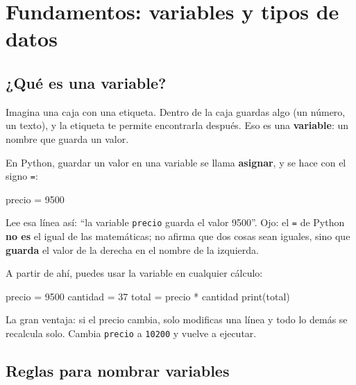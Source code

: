 \documentclass[
  spanish,
  letterpaper,
  DIV=11,
  numbers=noendperiod]{scrreprt}
\newenvironment{Shaded}{\begin{snugshade}}{\end{snugshade}}
\newcommand{\BuiltInTok}[1]{\textcolor[rgb]{0.00,0.23,0.31}{#1}}
\newcommand{\DecValTok}[1]{\textcolor[rgb]{0.68,0.00,0.00}{#1}}
\newcommand{\NormalTok}[1]{\textcolor[rgb]{0.00,0.23,0.31}{#1}}
\newcommand{\OperatorTok}[1]{\textcolor[rgb]{0.37,0.37,0.37}{#1}}
\begin{document}

\chapter{Fundamentos: variables y tipos de
datos}\label{fundamentos-variables-y-tipos-de-datos}

\section{¿Qué es una variable?}\label{quuxe9-es-una-variable}

Imagina una caja con una etiqueta. Dentro de la caja guardas algo (un
número, un texto), y la etiqueta te permite encontrarla después. Eso es
una \textbf{variable}: un nombre que guarda un valor.

En Python, guardar un valor en una variable se llama \textbf{asignar}, y
se hace con el signo \texttt{=}:

\begin{Shaded}
\begin{Highlighting}[]
\NormalTok{precio }\OperatorTok{=} \DecValTok{9500}
\end{Highlighting}
\end{Shaded}

Lee esa línea así: ``la variable \texttt{precio} guarda el valor 9500''.
Ojo: el \texttt{=} de Python \textbf{no es} el igual de las matemáticas;
no afirma que dos cosas sean iguales, sino que \textbf{guarda} el valor
de la derecha en el nombre de la izquierda.

A partir de ahí, puedes usar la variable en cualquier cálculo:

\begin{Shaded}
\begin{Highlighting}[]
\NormalTok{precio }\OperatorTok{=} \DecValTok{9500}
\NormalTok{cantidad }\OperatorTok{=} \DecValTok{37}
\NormalTok{total }\OperatorTok{=}\NormalTok{ precio }\OperatorTok{*}\NormalTok{ cantidad}
\BuiltInTok{print}\NormalTok{(total)}
\end{Highlighting}
\end{Shaded}

La gran ventaja: si el precio cambia, solo modificas una línea y todo lo
demás se recalcula solo. Cambia \texttt{precio} a \texttt{10200} y
vuelve a ejecutar.

\section{Reglas para nombrar
variables}\label{reglas-para-nombrar-variables}
\end{document}
